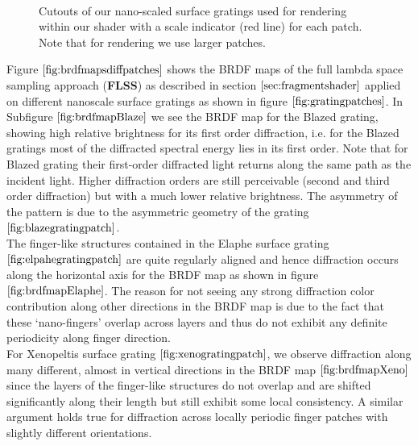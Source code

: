 \begin{figure}[H]
  \centering
~
~

\caption[Our Gratings]{Cutouts of our nano-scaled surface gratings used for rendering within our shader with a scale indicator (red line) for each patch. Note that for rendering we use larger patches.}
\label{fig:gratingpatches}
\end{figure}

Figure $\ref{fig:brdfmapsdiffpatches}$ shows the BRDF maps of the full lambda space sampling approach (\textbf{FLSS}) as described in section $\ref{sec:fragmentshader}$ applied on different nanoscale surface gratings as shown in figure $\ref{fig:gratingpatches}$. In Subfigure $\ref{fig:brdfmapBlaze}$ we see the BRDF map for the Blazed grating, showing high relative brightness for its first order diffraction, i.e. for the Blazed gratings most of the diffracted spectral energy lies in its first order. Note that for Blazed grating their first-order diffracted light returns along the same path as the incident light. Higher diffraction orders are still perceivable (second and third order diffraction) but with a much lower relative brightness. The asymmetry of the pattern is due to the asymmetric geometry of the grating $\ref{fig:blazegratingpatch}$. \\

The finger-like structures contained in the Elaphe surface grating $\ref{fig:elpahegratingpatch}$ are quite regularly aligned and hence diffraction occurs along the horizontal axis for the BRDF map as shown in figure $\ref{fig:brdfmapElaphe}$. The reason for not seeing any strong diffraction color contribution along other directions in the BRDF map is due to the fact that these ‘nano-fingers’ overlap across layers and thus do not exhibit any definite periodicity along finger direction. \\

For Xenopeltis surface grating $\ref{fig:xenogratingpatch}$, we observe diffraction along many different, almost in vertical directions in the BRDF map $\ref{fig:brdfmapXeno}$ since the layers of the finger-like structures do not overlap and are shifted significantly along their length but still exhibit some local consistency. A similar argument holds true for diffraction across locally periodic finger patches with slightly different orientations. 

